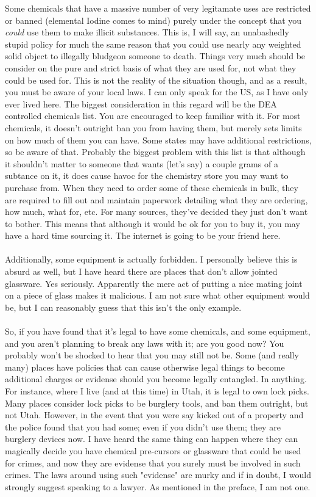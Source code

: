 \documentclass{book}
\begin{document}
Some chemicals that have a massive number of very legitamate uses are restricted or banned (elemental Iodine comes to mind) purely under the concept that you \textit{could} use them to make illicit substances.  This is, I will say, an unabashedly stupid policy for much the same reason that you could use nearly any weighted solid object to illegally bludgeon someone to death.  Things very much should be consider on the pure and strict basis of what they are used for, not what they could be used for.  This is not the reality of the situation though, and as a result, you must be aware of your local laws.  I can only speak for the US, as I have only ever lived here.  The biggest consideration in this regard will be the DEA controlled chemicals list.  You are encouraged to keep familiar with it.  For most chemicals, it doesn't outright ban you from having them, but merely sets limits on how much of them you can have.  Some states may have additional restrictions, so be aware of that.  Probably the biggest problem with this list is that although it shouldn't matter to someone that wants (let's say) a couple grams of a subtance on it, it does cause havoc for the chemistry store you may want to purchase from.  When they need to order some of these chemicals in bulk, they are required to fill out and maintain paperwork detailing what they are ordering, how much, what for, etc.  For many sources, they've decided they just don't want to bother.  This means that although it would be ok for you to buy it, you may have a hard time sourcing it.  The internet is going to be your friend here.\\
\\
Additionally, some equipment is actually forbidden.  I personally believe this is absurd as well, but I have heard there are places that don't allow jointed glassware.  Yes seriously.  Apparently the mere act of putting a nice mating joint on a piece of glass makes it malicious.  I am not sure what other equipment would be, but I can reasonably guess that this isn't the only example.\\
\\
So, if you have found that it's legal to have some chemicals, and some equipment, and you aren't planning to break any laws with it; are you good now?  You probably won't be shocked to hear that you may still not be.  Some (and really many) places have policies that can cause otherwise legal things to become additional charges or evidense should you become legally entangled.  In anything.  For instance, where I live (and at this time) in Utah, it is legal to own lock picks.  Many places consider lock picks to be burglery tools, and ban them outright, but not Utah.  However, in the event that you were say kicked out of a property and the police found that you had some; even if you didn't use them; they are burglery devices now.  I have heard the same thing can happen where they can magically decide you have chemical pre-cursors or glassware that could be used for crimes, and now they are evidense that you surely must be involved in such crimes.  The laws around using such "evidense" are murky and if in doubt, I would strongly suggest speaking to a lawyer.  As mentioned in the preface, I am not one.\\
\end{document}
